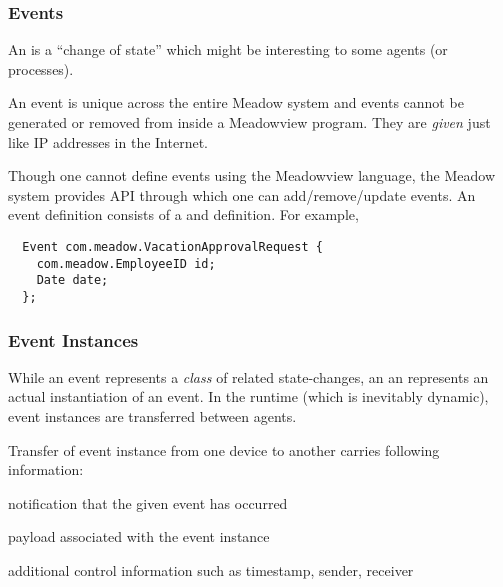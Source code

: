 \documentclass{beamer}
\begin{document}
\begin{frame}[fragile]
\frametitle{Events}

An  is a ``change of state'' which might be interesting to some
agents (or processes). 

\vspace*{0.3cm}

An event is unique across the entire Meadow system and events cannot be
generated or removed from inside a Meadowview program. They are {\em given\/}
just like IP addresses in the Internet.

\vspace*{0.2cm}

Though one cannot define events using the Meadowview language, the Meadow
system provides API through which one can add/remove/update events. An event
definition consists of a  and  definition.
For example,

{\small
\begin{verbatim}
  Event com.meadow.VacationApprovalRequest {
    com.meadow.EmployeeID id;
    Date date;
  };
\end{verbatim}}

\end{frame}

\begin{frame}
\frametitle{Event Instances}

While an event represents a {\em class\/} of related state-changes, an 
an  represents an actual instantiation of an event.
In the runtime (which is inevitably dynamic), event instances are
transferred between agents.


\vspace*{0.3cm}

Transfer of event instance from one device to another carries following
information:

\bit
\w notification that the given event has occurred

\vspace*{0.3cm}

\w payload associated with the event instance

\vspace*{0.3cm}

\w additional control information such as timestamp, sender, receiver

\eit

\end{frame}
\end{document}

